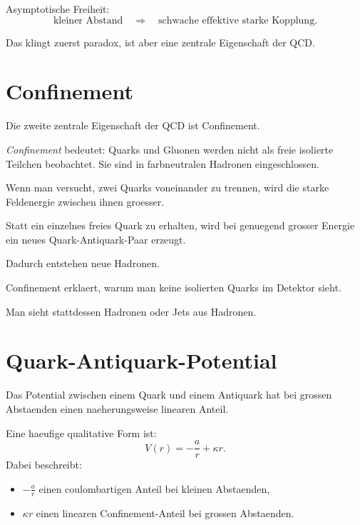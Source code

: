 \begin{examtipbox}
Asymptotische Freiheit:
\[
    \text{kleiner Abstand}
    \quad\Rightarrow\quad
    \text{schwache effektive starke Kopplung}.
\]

Das klingt zuerst paradox, ist aber eine zentrale Eigenschaft der QCD.
\end{examtipbox}

\section{Confinement}

Die zweite zentrale Eigenschaft der QCD ist Confinement.

\begin{definitionbox}
\emph{Confinement} bedeutet:
Quarks und Gluonen werden nicht als freie isolierte Teilchen beobachtet.
Sie sind in farbneutralen Hadronen eingeschlossen.
\end{definitionbox}

\begin{conceptbox}
Wenn man versucht, zwei Quarks voneinander zu trennen, wird die starke Feldenergie
zwischen ihnen groesser.

Statt ein einzelnes freies Quark zu erhalten, wird bei genuegend grosser Energie ein
neues Quark-Antiquark-Paar erzeugt.

Dadurch entstehen neue Hadronen.
\end{conceptbox}

\begin{examtipbox}
Confinement erklaert, warum man keine isolierten Quarks im Detektor sieht.

Man sieht stattdessen Hadronen oder Jets aus Hadronen.
\end{examtipbox}

\section{Quark-Antiquark-Potential}

Das Potential zwischen einem Quark und einem Antiquark hat bei grossen Abstaenden
einen naeherungsweise linearen Anteil.

\begin{formulabox}
Eine haeufige qualitative Form ist:
\[
    V(r)
    =
    -\frac{a}{r}
    +
    \kappa r.
\]
Dabei beschreibt:
\begin{itemize}
    \item $-\frac{a}{r}$ einen coulombartigen Anteil bei kleinen Abstaenden,
    \item $\kappa r$ einen linearen Confinement-Anteil bei grossen Abstaenden.
\end{itemize}
\end{formulabox}

